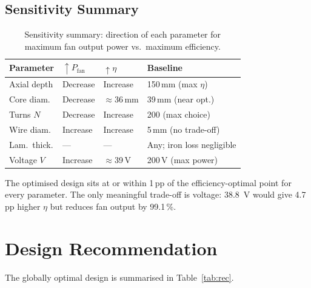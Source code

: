 \documentclass[10pt, twocolumn, a4paper]{article}
\begin{document}
\subsection{Sensitivity Summary}

\begin{table}[H]
  \centering
  \caption{Sensitivity summary: direction of each parameter for
           maximum fan output power vs.\ maximum efficiency.}
  \label{tab:sensitivity}
  \small
  \setlength{\tabcolsep}{4pt}
  \begin{tabular}{@{} L{2.0cm} C{1.4cm} C{1.4cm} L{2.0cm} @{}}
    \toprule
    \textbf{Parameter} & \textbf{$\uparrow P_\text{fan}$} &
    \textbf{$\uparrow\eta$} & \textbf{Baseline} \\
    \midrule
    Axial depth   & Decrease & Increase & 150\,mm (max $\eta$) \\
    Core diam.    & Decrease & $\approx$36\,mm & 39\,mm (near opt.) \\
    Turns $N$     & Decrease & Increase & 200 (max choice) \\
    Wire diam.    & Increase & Increase & 5\,mm (no trade-off) \\
    Lam.\ thick.  & ---      & ---      & Any; iron loss negligible \\
    Voltage $V$   & Increase & $\approx$39\,V & 200\,V (max power) \\
    \bottomrule
  \end{tabular}
\end{table}

The optimised design sits at or within 1\,pp of the efficiency-optimal
point for every parameter.  The only meaningful trade-off is voltage:
\SI{38.8}{V} would give 4.7\,pp higher $\eta$ but reduces fan output
by 99.1\,\%.

\section{Design Recommendation}
\label{sec:rec}

The globally optimal design is summarised in Table~\ref{tab:rec}.
\end{document}
